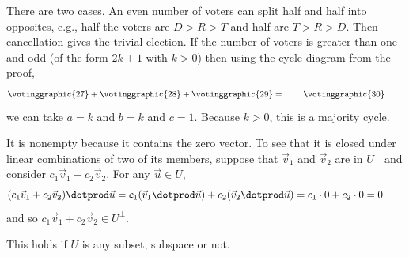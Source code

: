 \begin{ans}{5}
\begin{exparts}
\begin{equation*}
          \tag*{}\end{equation*}
        \partsitem There are two cases.
          An even number of voters can split half and half into opposites,
          e.g., half the voters are $D>R>T$ and half are $T>R>D$.
          Then cancellation gives the trivial election.
          If the number of voters is greater than one and odd (of the
          form $2k+1$ with $k>0$) then using the cycle diagram from the proof,
          \begin{equation*}
            \votinggraphic{27}  %
            +
            \votinggraphic{28}  %
            +
            \votinggraphic{29}  %
            =\hspace{.30in}
            \votinggraphic{30}  %
            \hspace{.30in}\hbox{}
          \end{equation*}
          we can take $a=k$ and $b=k$ and $c=1$.
          Because $k>0$, this is a majority cycle.
       \end{exparts}
    
\end{ans}
\begin{ans}{6}
      It is nonempty because it contains the zero vector.
      To see that it is closed under linear combinations of two of its
      members, suppose that $\vec{v}_1$ and $\vec{v}_2$ are in $U^\perp$
      and consider $c_1\vec{v}_1+c_2\vec{v}_2$.
      For any $\vec{u}\in U$,
      \begin{equation*}
        (c_1\vec{v}_1+c_2\vec{v}_2)\dotprod\vec{u}
        =c_1(\vec{v}_1\dotprod\vec{u})+c_2(\vec{v}_2\dotprod\vec{u})
        =c_1\cdot 0+c_2\cdot 0=0
      \tag*{}\end{equation*}
      and so $c_1\vec{v}_1+c_2\vec{v}_2\in U^\perp$.

      This holds if $U$ is any subset, subspace or not.
    
\end{ans}
